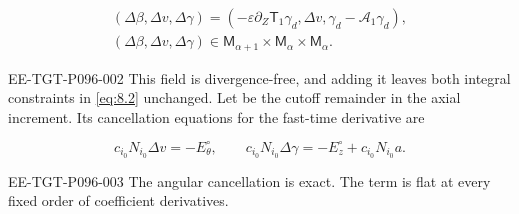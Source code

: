 \begin{lemma}
\begin{equation}
\begin{gathered}
(\Delta\beta,\Delta v,\Delta\gamma)
=(-\varepsilon\partial_Z\mathsf T_1\gamma_d,\Delta v,\gamma_d-\mathcal A_1\gamma_d),\\
(\Delta\beta,\Delta v,\Delta\gamma)
\in \mathsf M_{\alpha+1}\times \mathsf M_\alpha\times \mathsf M_\alpha.
\end{gathered}
\tag{8.21}\label{eq:8.21}
\end{equation}
\begin{EESegment}{EE-TGT-P096-002}
This field is divergence-free, and adding it leaves both integral constraints in \eqref{eq:8.2}
unchanged. Let  be the cutoff remainder in the
axial increment. Its cancellation equations for the fast-time derivative are
\end{EESegment}
\begin{equation}
c_{i_0}N_{i_0}\Delta v=-E_\theta^\circ,
\qquad
c_{i_0}N_{i_0}\Delta\gamma=-E_z^\circ+c_{i_0}N_{i_0}a.
\tag{8.22}\label{eq:8.22}
\end{equation}
\begin{EESegment}{EE-TGT-P096-003}
The angular cancellation is exact. The term
 is flat at every fixed order of coefficient derivatives.
\end{EESegment}
\end{lemma}

